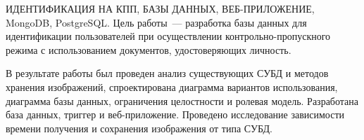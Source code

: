 \begin{essay}{ИДЕНТИФИКАЦИЯ НА КПП, БАЗЫ ДАННЫХ, ВЕБ-ПРИЛОЖЕНИЕ, MongoDB, PostgreSQL.}
	Цель работы~--- разработка базы данных для идентификации пользователей при осуществлении контрольно-пропускного режима с использованием документов, удостоверяющих личность.
	
	В результате работы был проведен анализ существующих СУБД и методов хранения изображений, спроектирована диаграмма вариантов использования, диаграмма базы данных, ограничения целостности и ролевая модель.
	Разработана база данных, триггер и веб-приложение.
	Проведено исследование зависимости времени получения и сохранения изображения от типа СУБД.
\end{essay}